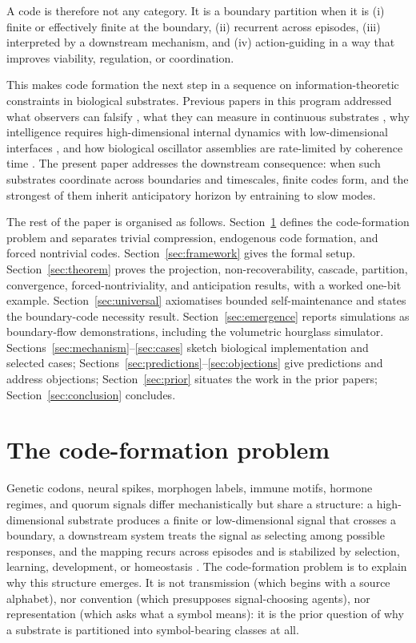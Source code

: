 \documentclass[12pt]{article}
\theoremstyle{definition}
\begin{document}
A code is therefore not any category. It is a boundary partition when it is (i) finite or effectively finite at the boundary, (ii) recurrent across episodes, (iii) interpreted by a downstream mechanism, and (iv) action-guiding in a way that improves viability, regulation, or coordination.

This makes code formation the next step in a sequence on information-theoretic constraints in biological substrates. Previous papers in this program addressed what observers can falsify \citep{todd2025falsifiability}, what they can measure in continuous substrates \citep{todd2025maxwell}, why intelligence requires high-dimensional internal dynamics with low-dimensional interfaces \citep{todd2026a_intelligence}, and how biological oscillator assemblies are rate-limited by coherence time \citep{todd2026b_coherencetime}. The present paper addresses the downstream consequence: when such substrates coordinate across boundaries and timescales, finite codes form, and the strongest of them inherit anticipatory horizon by entraining to slow modes.

The rest of the paper is organised as follows. Section~\ref{sec:problem} defines the code-formation problem and separates trivial compression, endogenous code formation, and forced nontrivial codes. Section~\ref{sec:framework} gives the formal setup. Section~\ref{sec:theorem} proves the projection, non-recoverability, cascade, partition, convergence, forced-nontriviality, and anticipation results, with a worked one-bit example. Section~\ref{sec:universal} axiomatises bounded self-maintenance and states the boundary-code necessity result. Section~\ref{sec:emergence} reports simulations as boundary-flow demonstrations, including the volumetric hourglass simulator. Sections~\ref{sec:mechanism}--\ref{sec:cases} sketch biological implementation and selected cases; Sections~\ref{sec:predictions}--\ref{sec:objections} give predictions and address objections; Section~\ref{sec:prior} situates the work in the prior papers; Section~\ref{sec:conclusion} concludes.

\section{The code-formation problem}
\label{sec:problem}

Genetic codons, neural spikes, morphogen labels, immune motifs, hormone regimes, and quorum signals differ mechanistically but share a structure: a high-dimensional substrate produces a finite or low-dimensional signal that crosses a boundary, a downstream system treats the signal as selecting among possible responses, and the mapping recurs across episodes and is stabilized by selection, learning, development, or homeostasis \citep{levin2023,levin2025multiscale}. The code-formation problem is to explain why this structure emerges. It is not transmission (which begins with a source alphabet), nor convention (which presupposes signal-choosing agents), nor representation (which asks what a symbol means): it is the prior question of why a substrate is partitioned into symbol-bearing classes at all.
\end{document}
